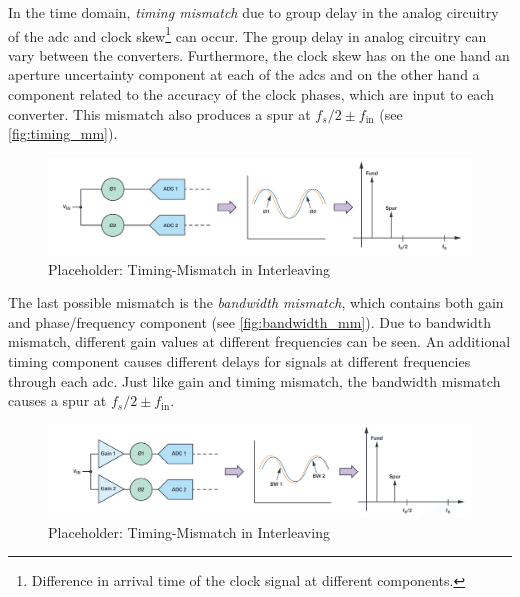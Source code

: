 In the time domain, \textit{timing mismatch} due to group delay in the analog circuitry of the \gls{adc} and clock skew\footnote{Difference in arrival time of the clock signal at different components.} can occur. The group delay in analog circuitry can vary between the converters. Furthermore, the clock skew has on the one hand an aperture uncertainty component at each of the \glspl{adc} and on the other hand a component related to the accuracy of the clock phases, which are input to each converter. \cite{Harris2019} This mismatch also produces a spur at $f_s/2 \pm f_{\text{in}}$ (see \autoref{fig:timing_mm}).

\begin{figure}[tbh]
	\centering
	\includegraphics[width = \textwidth]{chap/02-theory/img/timing_mm}
	\caption{Placeholder: Timing-Mismatch in Interleaving \cite{Harris2019}}
	\label{fig:timing_mm}
\end{figure}

The last possible mismatch is the \textit{bandwidth mismatch}, which contains both gain and phase/frequency component (see \autoref{fig:bandwidth_mm}). Due to bandwidth mismatch, different gain values at different frequencies can be seen. An additional timing component causes different delays for signals at different frequencies through each \gls{adc}. Just like gain and timing mismatch, the bandwidth mismatch causes a spur at $f_s/2 \pm f_{\text{in}}$.
\begin{figure}[tbh]
	\centering
	\includegraphics[width = \textwidth]{chap/02-theory/img/bandwidth_mm}
	\caption{Placeholder: Timing-Mismatch in Interleaving \cite{Harris2019}}
	\label{fig:bandwidth_mm}
\end{figure}

